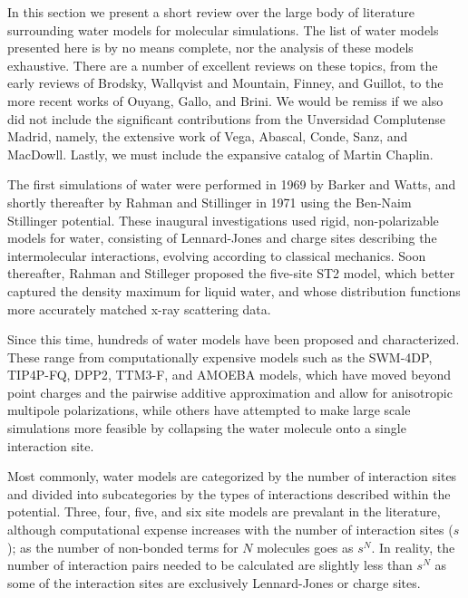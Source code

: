 In this section we present a short review over the large body of
literature surrounding water models for molecular simulations. The
list of water models presented here is by no means complete, nor the
analysis of these models exhaustive. There are a number of excellent
reviews on these topics, from the early reviews of
Brodsky\cite{Brodsky1996}, Wallqvist and Mountain\cite{Wallqvist1999},
Finney\cite{Finney2001}, and Guillot\cite{Guillot2002}, to the more
recent works of Ouyang\cite{Ouyang2015}, Gallo\cite{Gallo2016}, and
Brini\cite{Brini2017}. We would be remiss if we also did not include
the significant contributions from the Unversidad Complutense Madrid,
namely, the extensive work of Vega, Abascal, Conde, Sanz, and
MacDowll.\cite{MacDowell2004,Vega2005,Vega2005c,Abascal2007,Abascal2007a,Abascal2007b,Abascal2007c,Vega2009,Vega2011,Vega2011a,Vega2015}
Lastly, we must include the expansive catalog of Martin
Chaplin.\cite{Chaplin2018}

The first simulations of water were performed in 1969 by Barker and
Watts,\cite{Barker1969} and shortly thereafter by Rahman and
Stillinger in 1971\cite{Rahman1971} using the Ben-Naim Stillinger
potential\cite{Ben-Naim1972}. These inaugural investigations used
rigid, non-polarizable models for water, consisting of Lennard-Jones
and charge sites describing the intermolecular interactions, evolving
according to classical mechanics. Soon thereafter, Rahman and
Stilleger proposed the five-site ST2 model, which better captured the
density maximum for liquid water, and whose distribution functions
more accurately matched x-ray scattering data.\cite{Stillinger1974}

Since this time, hundreds of water models have been proposed and
characterized.\cite{Chaplin2018} These range from computationally
expensive models such as the SWM-4DP\cite{Lamourex2003},
TIP4P-FQ\cite{Rick1994}, DPP2\cite{Kumar2010},
TTM3-F\cite{Fanourgakis2008}, and AMOEBA\cite{Ren2003,Ren2004} models,
which have moved beyond point charges and the pairwise additive
approximation and allow for anisotropic multipole polarizations, while
others have attempted to make large scale simulations more feasible by
collapsing the water molecule onto a single interaction
site\cite{Liu1996,Tan2003,Fennell2004}.

Most commonly, water models are categorized by the number of
interaction sites and divided into subcategories by the types of
interactions described within the potential. Three, four, five, and
six site models are prevalant in the literature, although
computational expense increases with the number of interaction sites
($s$); as the number of non-bonded terms for $N$ molecules goes as
$s^N$. In reality, the number of interaction pairs needed to be
calculated are slightly less than $s^N$ as some of the interaction
sites are exclusively Lennard-Jones or charge sites.

